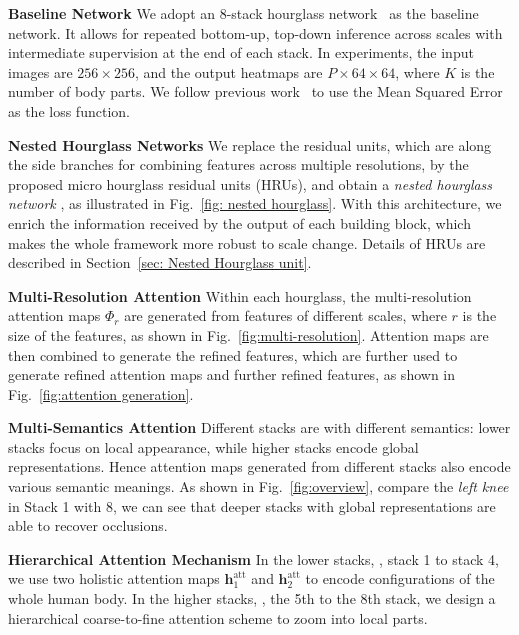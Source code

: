 \documentclass[10pt,twocolumn,letterpaper]{article}
\newcommand{\smalltitle}[1]{\vspace{0.2em}\noindent \textbf{{#1}}}
\begin{document}
\smalltitle{Baseline Network} 
We adopt an 8-stack hourglass network~\cite{newell2016stacked} as the baseline network. 
It allows for repeated bottom-up, top-down inference across scales with intermediate supervision at the end of each stack.  
In experiments, the input images are $256\times 256$, and the output heatmaps are $P\times 64\times 64$, where $K$ is the number of body parts. 
We follow previous work~\cite{tompson2015efficient,wei2016convolutional,newell2016stacked} to use the Mean Squared Error as the loss function. 

\smalltitle{Nested Hourglass Networks} 
We replace the residual units, which are along the side branches for combining features across multiple resolutions, 
by the proposed micro hourglass residual units (HRUs), and obtain a \textit{nested hourglass network}
, as illustrated in Fig.~\ref{fig: nested hourglass}. 
With this architecture, we enrich the information received by the output of each building block, which makes the whole framework more robust to scale change. 
Details of HRUs are described in Section~\ref{sec: Nested Hourglass unit}.

\smalltitle{Multi-Resolution Attention} 
Within each hourglass, the multi-resolution attention maps $\Phi_r$ are generated from features of different scales, where $r$ is the size of the features, as shown in Fig.~\ref{fig:multi-resolution}.
Attention maps are then combined to generate the refined features, which are further used to generate refined attention maps and further refined features, as shown in Fig.~\ref{fig:attention generation}.


\smalltitle{Multi-Semantics Attention}
Different stacks are with different semantics: lower stacks focus on local appearance, while higher stacks encode global representations.
Hence attention maps generated from different stacks also encode various semantic meanings. 
As shown in Fig.~\ref{fig:overview}, compare the \textit{left knee} in Stack 1 with 8, we can see that deeper stacks with global representations are able to recover occlusions.

\smalltitle{Hierarchical Attention Mechanism} 
In the lower stacks, \ie, stack 1 to stack 4, we use two holistic attention maps $\mathbf{h}_1^{\text{att}}$ and $\mathbf{h}_2^{\text{att}}$ to encode configurations of the whole human body. 
In the higher stacks, \ie, the 5th to the 8th stack, we design a hierarchical coarse-to-fine attention scheme to zoom into local parts. 


\vspace{-1em}
\end{document}
